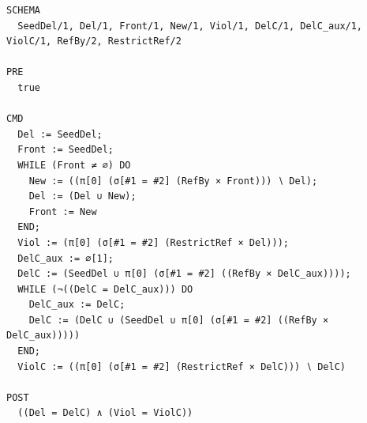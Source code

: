 \documentclass[10pt]{article}
\begin{document}
\begin{Verbatim}[fontsize=\scriptsize,breaklines=true,breakanywhere=true,frame=single,framesep=1.5mm]
SCHEMA
  SeedDel/1, Del/1, Front/1, New/1, Viol/1, DelC/1, DelC_aux/1, ViolC/1, RefBy/2, RestrictRef/2

PRE
  true

CMD
  Del := SeedDel;
  Front := SeedDel;
  WHILE (Front ≠ ∅) DO
    New := ((π[0] (σ[#1 = #2] (RefBy × Front))) ∖ Del);
    Del := (Del ∪ New);
    Front := New
  END;
  Viol := (π[0] (σ[#1 = #2] (RestrictRef × Del)));
  DelC_aux := ∅[1];
  DelC := (SeedDel ∪ π[0] (σ[#1 = #2] ((RefBy × DelC_aux))));
  WHILE (¬((DelC = DelC_aux))) DO
    DelC_aux := DelC;
    DelC := (DelC ∪ (SeedDel ∪ π[0] (σ[#1 = #2] ((RefBy × DelC_aux)))))
  END;
  ViolC := ((π[0] (σ[#1 = #2] (RestrictRef × DelC))) ∖ DelC)

POST
  ((Del = DelC) ∧ (Viol = ViolC))
\end{Verbatim}
\end{document}
